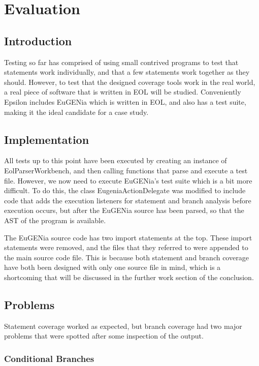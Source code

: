\chapter{Evaluation}

\section{Introduction}

Testing so far has comprised of using small contrived programs to test that statements work individually, and that a few statements work together as they should. However, to test that the designed coverage tools work in the real world, a real piece of software that is written in EOL will be studied. Conveniently Epsilon includes EuGENia which is written in EOL, and also has a test suite, making it the ideal candidate for a case study.

\section{Implementation}

All tests up to this point have been executed by creating an instance of EolParserWorkbench, and then calling functions that parse and execute a test file. However, we now need to execute EuGENia's test suite which is a bit more difficult. To do this, the class EugeniaActionDelegate was modified to include code that adds the execution listeners for statement and branch analysis before execution occurs, but after the EuGENia source has been parsed, so that the AST of the program is available.

The EuGENia source code has two import statements at the top. These import statements were removed, and the files that they referred to were appended to the main source code file. This is because both statement and branch coverage have both been designed with only one source file in mind, which is a shortcoming that will be discussed in the further work section of the conclusion.

\section{Problems}

Statement coverage worked as expected, but branch coverage had two major problems that were spotted after some inspection of the output. 

\subsection{Conditional Branches}

